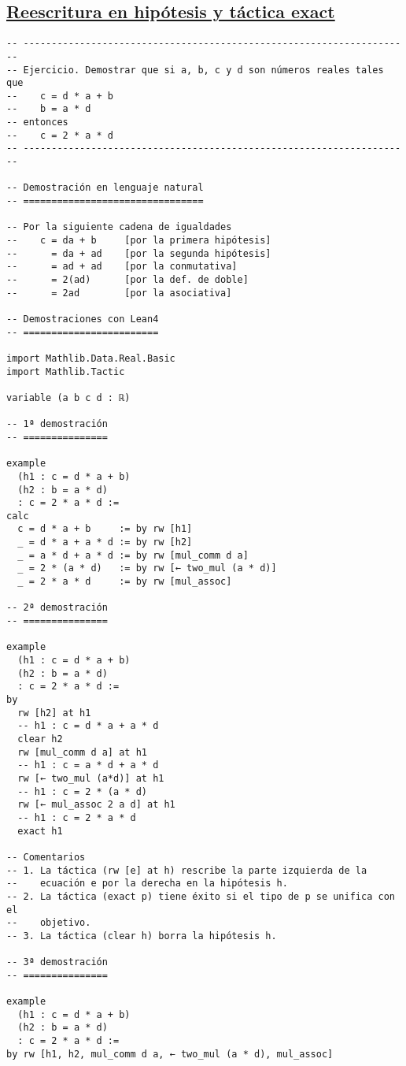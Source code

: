 \subsection{\href{./src/Basicos/Reescritura\_en\_hipotesis\_y\_tactica\_exact.lean}{Reescritura en hipótesis y táctica exact}}
\label{sec:org0340153}
\begin{verbatim}
-- ---------------------------------------------------------------------
-- Ejercicio. Demostrar que si a, b, c y d son números reales tales que
--    c = d * a + b
--    b = a * d
-- entonces
--    c = 2 * a * d
-- ---------------------------------------------------------------------

-- Demostración en lenguaje natural
-- ================================

-- Por la siguiente cadena de igualdades
--    c = da + b     [por la primera hipótesis]
--      = da + ad    [por la segunda hipótesis]
--      = ad + ad    [por la conmutativa]
--      = 2(ad)      [por la def. de doble]
--      = 2ad        [por la asociativa]

-- Demostraciones con Lean4
-- ========================

import Mathlib.Data.Real.Basic
import Mathlib.Tactic

variable (a b c d : ℝ)

-- 1ª demostración
-- ===============

example
  (h1 : c = d * a + b)
  (h2 : b = a * d)
  : c = 2 * a * d :=
calc
  c = d * a + b     := by rw [h1]
  _ = d * a + a * d := by rw [h2]
  _ = a * d + a * d := by rw [mul_comm d a]
  _ = 2 * (a * d)   := by rw [← two_mul (a * d)]
  _ = 2 * a * d     := by rw [mul_assoc]

-- 2ª demostración
-- ===============

example
  (h1 : c = d * a + b)
  (h2 : b = a * d)
  : c = 2 * a * d :=
by
  rw [h2] at h1
  -- h1 : c = d * a + a * d
  clear h2
  rw [mul_comm d a] at h1
  -- h1 : c = a * d + a * d
  rw [← two_mul (a*d)] at h1
  -- h1 : c = 2 * (a * d)
  rw [← mul_assoc 2 a d] at h1
  -- h1 : c = 2 * a * d
  exact h1

-- Comentarios
-- 1. La táctica (rw [e] at h) rescribe la parte izquierda de la
--    ecuación e por la derecha en la hipótesis h.
-- 2. La táctica (exact p) tiene éxito si el tipo de p se unifica con el
--    objetivo.
-- 3. La táctica (clear h) borra la hipótesis h.

-- 3ª demostración
-- ===============

example
  (h1 : c = d * a + b)
  (h2 : b = a * d)
  : c = 2 * a * d :=
by rw [h1, h2, mul_comm d a, ← two_mul (a * d), mul_assoc]


\end{verbatim}
